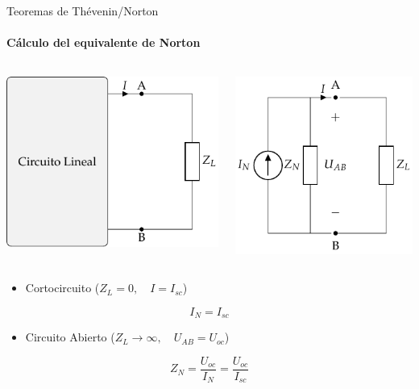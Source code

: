 \documentclass[aspectratio=169, usenames,svgnames,dvipsnames]{beamer}
\begin{document}
\begin{frame}[label={sec:org17aac3c}]{Teoremas de Thévenin/Norton}
\framesubtitle{Cálculo del equivalente de Norton}
\begin{columns}
\begin{column}{0.5\columnwidth}
\begin{center}
\includegraphics[height=0.38\textheight]{../figs/CircuitoLineal_ZL.pdf}
\end{center}
\end{column}

\begin{column}{0.5\columnwidth}
\begin{center}
\includegraphics[height=0.38\textheight]{../figs/EquivalenteNorton.pdf}
\end{center}
\end{column}
\end{columns}

\begin{itemize}
\item Cortocircuito (\(Z_L = 0, \quad I = I_{sc}\))
\end{itemize}
\[
\boxed{I_N = I_{sc}}
\]
\begin{itemize}
\item Circuito Abierto (\(Z_L \to \infty, \quad U_{AB} = U_{oc}\))
\end{itemize}
\[
\boxed{Z_N = \frac{U_{oc}}{I_N} = \frac{U_{oc}}{I_{sc}}}
\]
\end{frame}
\end{document}
